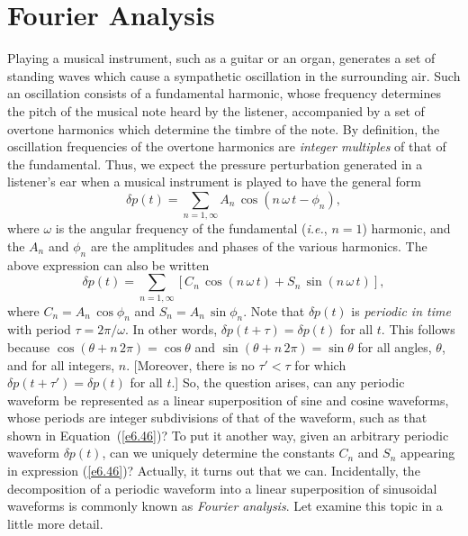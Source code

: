 \section{Fourier Analysis}\label{s6.4}
Playing a  musical instrument, such as a guitar or an organ, generates
a set of standing waves which cause a sympathetic oscillation in the surrounding air. Such an oscillation consists of a fundamental harmonic,
whose frequency determines the pitch of the musical note heard by the listener, 
accompanied by a set of overtone harmonics which determine the timbre of the note. By definition, the oscillation frequencies of the overtone harmonics are
{\em integer multiples}\/ of that of the fundamental.
Thus, we expect the pressure perturbation generated in a listener's ear when a musical instrument
is played to have the general form
\begin{equation}
\delta p(t) = \sum_{n=1,\infty} A_{n}\,\cos(n\,\omega\,t-\phi_{n}),
\end{equation}
where $\omega$ is the angular frequency of the fundamental ({\em i.e.}, $n=1$) harmonic, and the $A_n$ and $\phi_n$ are the amplitudes and phases of the
various harmonics. The above expression can also be written
\begin{equation}\label{e6.46}
\delta p(t) = \sum_{n=1,\infty} \left[C_{n}\,\cos(n\,\omega\,t)+ S_{n}\,\sin(n\,\omega\,t)\right],
\end{equation}
where $C_n=A_n\,\cos\phi_n$ and $S_n=A_n\,\sin\phi_n$.  Note that $\delta p(t)$ is
{\em periodic in time}\/ with period $\tau=2\pi/\omega$. In other words,
$\delta p(t+\tau)=\delta p(t)$ for all $t$.
This follows because $\cos(\theta+n\,2\pi)=\cos\theta$ and $\sin(\theta+n\,2\pi)=\sin\theta$ for all angles, $\theta$, and for all integers, $n$.  [Moreover, there is no $\tau'<\tau$ for which
$\delta p(t+\tau')=\delta p(t)$ for all $t$.]
So, the question arises, can any periodic waveform be represented as a linear superposition of sine and cosine waveforms, whose periods are integer subdivisions of that of the waveform, such as that shown in Equation~(\ref{e6.46})? To put it another way, given an arbitrary periodic
waveform $\delta p(t)$, can we uniquely determine the constants $C_n$ and $S_n$
appearing in expression (\ref{e6.46})? Actually,  it turns out that we can. Incidentally, the decomposition of
a periodic waveform into a linear superposition of sinusoidal waveforms is commonly known
as {\em Fourier analysis}. Let examine this topic in a little more detail.

